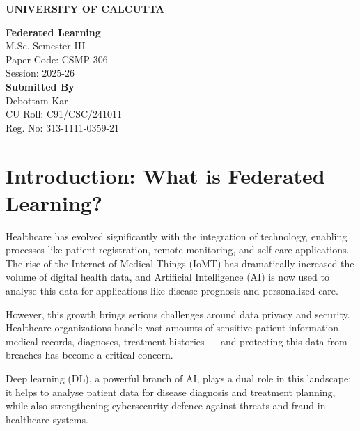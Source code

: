 \documentclass[12pt]{article}
\begin{document}
\begin{titlepage}
    \centering
    \vspace*{1cm}
    
    {\Huge \textbf{UNIVERSITY OF CALCUTTA}}\\[1.5cm]
    
    \vfill
    
    {\LARGE \textbf{Federated Learning}}\\[0.5cm]
    {\large M.Sc. Semester III}\\[0.3cm]
    {\large Paper Code: CSMP-306}\\[0.3cm]
    {\large Session: 2025-26}\\[1cm]
    
    {\large \textbf{Submitted By}}\\[0.2cm]
    {\large Debottam Kar}\\[0.2cm]
    {\large CU Roll: C91/CSC/241011}\\[0.2cm]
    {\large Reg. No: 313-1111-0359-21}
    
    \vfill
    
    {\large }
    
    \vspace*{1cm}
\end{titlepage}

\tableofcontents
\newpage

\section{Introduction: What is Federated Learning?}
\label{sec:intro}

Healthcare has evolved significantly with the integration of technology, enabling processes like patient registration, remote monitoring, and self-care applications. The rise of the Internet of Medical Things (IoMT) has dramatically increased the volume of digital health data, and Artificial Intelligence (AI) is now used to analyse this data for applications like disease prognosis and personalized care.

However, this growth brings serious challenges around data privacy and security. Healthcare organizations handle vast amounts of sensitive patient information — medical records, diagnoses, treatment histories — and protecting this data from breaches has become a critical concern.

Deep learning (DL), a powerful branch of AI, plays a dual role in this landscape: it helps to analyse patient data for disease diagnosis and treatment planning, while also strengthening cybersecurity defence against threats and fraud in healthcare systems.
\end{document}
